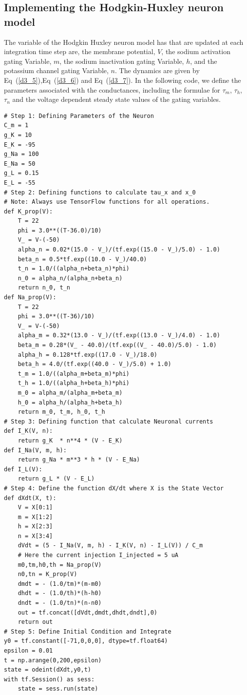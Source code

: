 \documentclass[10pt,letterpaper]{article}
\begin{document}
\begin{nolinenumbers}
\subsection*{Implementing the Hodgkin-Huxley neuron model}

The variable of the Hodgkin Huxley neuron model has that are updated at each integration time step are, the membrane potential, $V$, the sodium activation gating Variable, $m$, the sodium inactivation gating Variable, $h$, and the potassium channel gating Variable, $n$. The dynamics are given by Eq~(\ref{d3_5}),Eq~(\ref{d3_6}) and Eq~(\ref{d3_7}). In the following code, we define the parameters associated with the conductances, including the formulae for $\tau_{m}$, $\tau_{h}$, $\tau_{n}$ and the voltage dependent steady state values of the gating variables. 

\begin{verbatim}
# Step 1: Defining Parameters of the Neuron 
C_m = 1
g_K = 10
E_K = -95
g_Na = 100
E_Na = 50 
g_L = 0.15
E_L = -55
# Step 2: Defining functions to calculate tau_x and x_0
# Note: Always use TensorFlow functions for all operations.
def K_prop(V):
    T = 22
    phi = 3.0**((T-36.0)/10)
    V_ = V-(-50)
    alpha_n = 0.02*(15.0 - V_)/(tf.exp((15.0 - V_)/5.0) - 1.0)
    beta_n = 0.5*tf.exp((10.0 - V_)/40.0) 
    t_n = 1.0/((alpha_n+beta_n)*phi)
    n_0 = alpha_n/(alpha_n+beta_n)
    return n_0, t_n
def Na_prop(V):
    T = 22
    phi = 3.0**((T-36)/10)
    V_ = V-(-50)
    alpha_m = 0.32*(13.0 - V_)/(tf.exp((13.0 - V_)/4.0) - 1.0)
    beta_m = 0.28*(V_ - 40.0)/(tf.exp((V_ - 40.0)/5.0) - 1.0)
    alpha_h = 0.128*tf.exp((17.0 - V_)/18.0)
    beta_h = 4.0/(tf.exp((40.0 - V_)/5.0) + 1.0)
    t_m = 1.0/((alpha_m+beta_m)*phi)
    t_h = 1.0/((alpha_h+beta_h)*phi)
    m_0 = alpha_m/(alpha_m+beta_m)
    h_0 = alpha_h/(alpha_h+beta_h)
    return m_0, t_m, h_0, t_h
# Step 3: Defining function that calculate Neuronal currents
def I_K(V, n):
    return g_K  * n**4 * (V - E_K)
def I_Na(V, m, h):
    return g_Na * m**3 * h * (V - E_Na)
def I_L(V):
    return g_L * (V - E_L)
# Step 4: Define the function dX/dt where X is the State Vector
def dXdt(X, t):
    V = X[0:1]
    m = X[1:2]
    h = X[2:3]
    n = X[3:4]
    dVdt = (5 - I_Na(V, m, h) - I_K(V, n) - I_L(V)) / C_m 
    # Here the current injection I_injected = 5 uA
    m0,tm,h0,th = Na_prop(V)
    n0,tn = K_prop(V)
    dmdt = - (1.0/tm)*(m-m0)
    dhdt = - (1.0/th)*(h-h0)
    dndt = - (1.0/tn)*(n-n0)
    out = tf.concat([dVdt,dmdt,dhdt,dndt],0)
    return out
# Step 5: Define Initial Condition and Integrate
y0 = tf.constant([-71,0,0,0], dtype=tf.float64)
epsilon = 0.01
t = np.arange(0,200,epsilon)
state = odeint(dXdt,y0,t)
with tf.Session() as sess:
    state = sess.run(state)
\end{verbatim}


\end{nolinenumbers}
\end{document}
